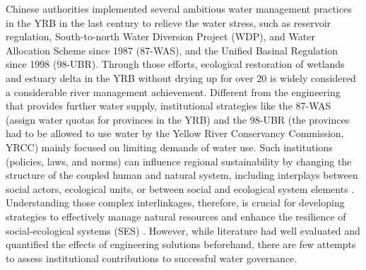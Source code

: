 Chinese authorities implemented several ambitious water management practices in the YRB in the last century to relieve the water stress, such as reservoir regulation, South-to-north Water Diversion Project (WDP), and Water Allocation Scheme since 1987 (87-WAS), and the Unified Basinal Regulation since 1998 (98-UBR).
Through those efforts, ecological restoration of wetlands and estuary delta in the YRB without drying up for over $20$ is widely considered a considerable river management achievement.
Different from the engineering that provides further water supply, institutional strategies like the 87-WAS (assign water quotas for provinces in the YRB) and the 98-UBR (the provinces had to be allowed to use water by the Yellow River Conservancy Commission, YRCC) mainly focused on limiting demands of water use.
Such institutions (policies, laws, and norms) can influence regional sustainability by changing the structure of the coupled human and natural system, including interplays between social actors, ecological units, or between social and ecological system elements \cite{young2008,cumming2020b,lien2020, bodin2017b}.
Understanding those complex interlinkages, therefore, is crucial for developing strategies to effectively manage natural resources and enhance the resilience of social-ecological systems (SES) \cite{kluger2020}.
However, while literature had well evaluated and quantified the effects of engineering solutions beforehand, there are few attempts to assess institutional contributions to successful water governance.


